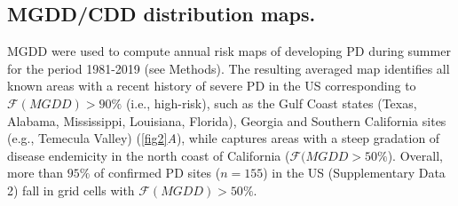 \subsection{MGDD/CDD distribution maps.}
MGDD were used to compute annual
risk maps of developing PD during summer for the period 1981-2019 (see
Methods). The resulting averaged map identifies all known areas with a
recent
history of severe PD in the US corresponding to $\mathcal{F}(MGDD) > 90\%$
(i.e., high-risk), such as the Gulf Coast states (Texas, Alabama,
Mississippi,
Louisiana, Florida), Georgia and Southern California sites (e.g., Temecula
Valley) (\cref{fig2}\textit{A}), while captures areas with a steep
gradation of
disease endemicity in the north coast of California ($\mathcal{F}(MGDD >
    50\%$). Overall, more than $95\%$ of confirmed PD sites ($n = 155$) in
    the
    US (Supplementary Data 2) fall in grid cells with $\mathcal{F}(MGDD) >
50 \%$.

